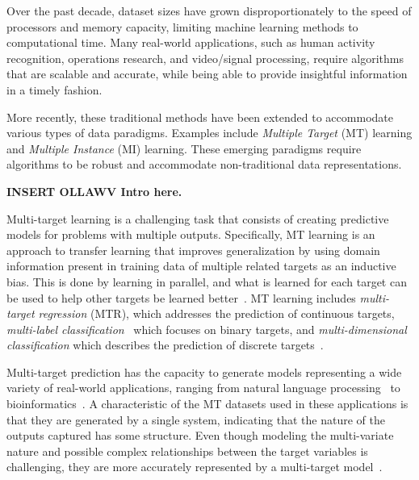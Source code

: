 \documentclass[reqno]{vcuthesis}
\numberwithin{equation}{chapter}
\begin{document}
Over the past decade, dataset sizes have grown disproportionately to the speed of processors and memory capacity, limiting machine learning methods to computational time. Many real-world applications, such as human activity recognition, operations research, and video/signal processing, require algorithms that are scalable and accurate, while being able to provide insightful information in a timely fashion.

More recently, these traditional methods have been extended to accommodate various types of data paradigms. Examples include \textit{Multiple Target} (MT) learning  and \textit{Multiple Instance} (MI) learning. These emerging paradigms require algorithms to be robust and accommodate non-traditional data representations.

\textbf{INSERT OLLAWV Intro here.}

Multi-target learning is a challenging task that consists of creating predictive models for problems with multiple outputs. Specifically, MT learning is an approach to transfer learning that improves generalization by using domain information present in training data of multiple related targets as an inductive bias. This is done by learning in parallel, and what is learned for each target can be used to help other targets be learned better~\cite{Baxter1997,Caruana1997,thrun1996learning}. MT learning includes \textit{multi-target regression} (MTR), which addresses the prediction of continuous targets, \textit{multi-label classification}~\cite{Zhang20141819} which focuses on binary targets, and \textit{multi-dimensional classification} which describes the prediction of discrete targets~\cite{Borchani2015}. 

Multi-target prediction has the capacity to generate models representing a wide variety of real-world applications, ranging from natural language processing~\cite{Jeong2009} to bioinformatics~\cite{Lui2010}. A characteristic of the MT datasets used in these applications is that they are generated by a single system, indicating that the nature of the outputs captured has some structure. Even though modeling the multi-variate nature and possible complex relationships between the target variables is challenging, they are more accurately represented by a multi-target model~\cite{Caruana1997,Evgeniou2005}.
\end{document}
